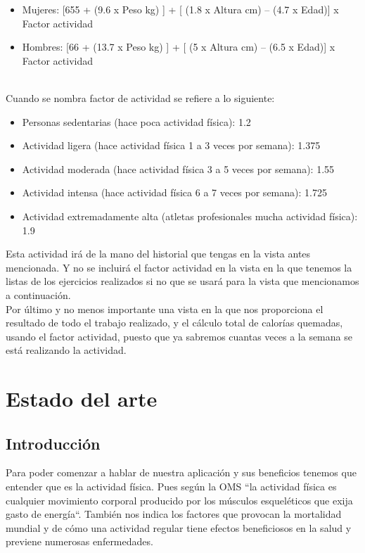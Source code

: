 \documentclass[a4paper, 11pt]{article}
\begin{document}
      \begin{itemize}
        \item{Mujeres:  [655 + (9.6 x Peso kg) ] + [ (1.8 x Altura cm) – (4.7 x Edad)] x Factor actividad}
        \item{Hombres:  [66 + (13.7 x Peso kg) ] + [ (5 x Altura cm) – (6.5 x Edad)] x Factor actividad}
      \end{itemize}
        \\Cuando se nombra factor de actividad se refiere a lo siguiente:
      \begin{itemize}
        \item{Personas sedentarias (hace poca actividad física): 1.2}
        \item{Actividad ligera (hace actividad física 1 a 3 veces por semana): 1.375}
        \item{Actividad moderada (hace actividad física 3 a 5 veces por semana): 1.55}
        \item{Actividad intensa (hace actividad física 6 a 7 veces por semana): 1.725}
        \item{Actividad extremadamente alta (atletas profesionales mucha actividad física): 1.9}
      \end{itemize}

      Esta actividad irá de la mano del historial que tengas en la vista antes
      mencionada. Y no se incluirá el factor actividad en la vista en la que tenemos
      la listas de los ejercicios realizados si no que se usará para la vista que
      mencionamos a continuación.\\

      Por último y no menos importante una vista en la que nos proporciona el
      resultado de todo el trabajo realizado, y el cálculo total de calorías quemadas,
      usando el factor actividad, puesto que ya sabremos cuantas veces a la semana se
      está realizando la actividad.\\


\section{Estado del arte}

    \subsection{Introducción}





      Para poder comenzar a hablar de nuestra aplicación y sus beneficios tenemos
      que entender que es la actividad física. Pues según la OMS ``la actividad
      física es cualquier movimiento corporal producido por los músculos esqueléticos
      que exija gasto de energía``. También nos indica los factores que provocan
      la mortalidad mundial y de cómo una actividad regular tiene efectos
      beneficiosos en la salud y previene numerosas enfermedades.\\
\end{document}
